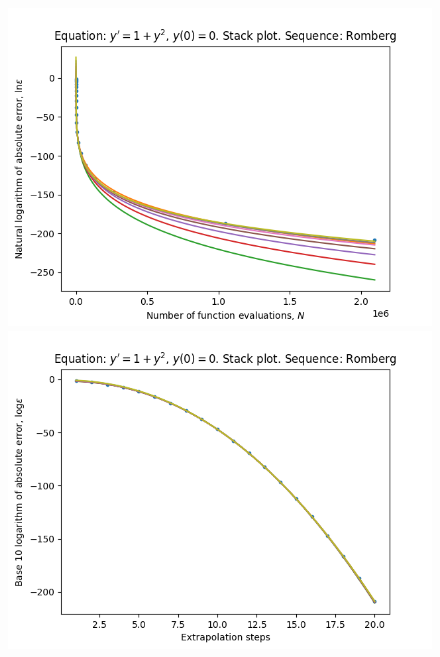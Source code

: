 \begin{figure}[H]
\centering
\begin{minipage}{0.45\textwidth}
\centering
\includegraphics[scale=0.45]{emr_plots/tangens_hp_romberg_stack.png}
\end{minipage}
\begin{minipage}{0.45\textwidth}
\centering
\includegraphics[scale=0.45]{emr_plots/tangens_hp_romberg_steps_stack.png}
\end{minipage}
\end{figure}

